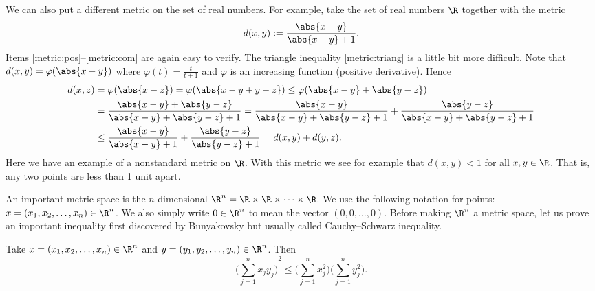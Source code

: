 \documentclass[12pt]{book}
\begin{document}
\begin{example}
We can also put a different metric on the set of real numbers.
For example, take the set of real numbers $\R$ together with the metric
\begin{equation*}
d(x,y) :=
\frac{\abs{x-y}}{\abs{x-y}+1} .
\end{equation*}
Items \ref{metric:pos}--\ref{metric:com} are again easy to verify.
The
triangle inequality \ref{metric:triang} is a little bit more difficult.
Note that $d(x,y) = \varphi(\abs{x-y})$ where $\varphi(t) =
\frac{t}{t+1}$ and $\varphi$ is an increasing function
(positive derivative).
Hence
\begin{equation*}
\begin{split}
d(x,z) & = \varphi(\abs{x-z}) = 
\varphi(\abs{x-y+y-z}) \leq
\varphi(\abs{x-y}+\abs{y-z})
\\
& =
\frac{\abs{x-y}+\abs{y-z}}{\abs{x-y}+\abs{y-z}+1} =
\frac{\abs{x-y}}{\abs{x-y}+\abs{y-z}+1} +
\frac{\abs{y-z}}{\abs{x-y}+\abs{y-z}+1}
\\
& \leq
\frac{\abs{x-y}}{\abs{x-y}+1} +
\frac{\abs{y-z}}{\abs{y-z}+1} =
d(x,y)+ d(y,z) .
\end{split}
\end{equation*}
Here we have an example of a nonstandard metric on $\R$.
With this metric
we see for example that $d(x,y) < 1$ for all $x,y \in \R$.
That is,
any two points are less than 1 unit apart.
\end{example}

An important metric space is the
$n$-dimensional \emph{} $\R^n = \R
\times \R \times \cdots \times \R$.
 We use the following
notation for points: $x =(x_1,x_2,\ldots,x_n) \in \R^n$.
We also
simply write $0 \in \R^n$ to mean the vector $(0,0,\ldots,0)$.
Before
making $\R^n$ a metric space, let us prove an important inequality first discovered by Bunyakovsky but usually called Cauchy--Schwarz inequality.

\begin{lemma}
Take $x =(x_1,x_2,\ldots,x_n) \in \R^n$ and $y =(y_1,y_2,\ldots,y_n) \in
\R^n$.
Then
\begin{equation*}
{\biggl( \sum_{j=1}^n x_j y_j \biggr)}^2
\leq
\biggl(\sum_{j=1}^n x_j^2 \biggr)
\biggl(\sum_{j=1}^n y_j^2 \biggr) .
\end{equation*}
\end{lemma}
\end{document}
